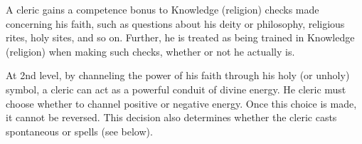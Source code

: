 \begin{comment}
\cf{Clr}{Turn or Rebuke Undead (Su)} Any cleric, regardless of alignment, has the power to affect undead creatures by channeling the power of his faith through his holy (or unholy) symbol.

Turning or rebuking undead requires a standard action and affects all undead within a large (50 foot) radius of the cleric to flee, as if panicked. Undead receive a Will save to negate the effect. The DC for this Will save is equal to 10 \add 1/2 the cleric's turning level \add the cleric's Cha. A cleric's turning level is normally equal to his class level. Intelligent undead receive a new saving throw each round to end the effect.

A cleric that turns undead causes the affected creatures to flee for 1 minute as if panicked. If the cleric's turning level is at least twice the HD of an affected undead, it is instead destroyed utterly.

A cleric that rebukes undead causes the affected creatures to cower for 1 minute. If the cleric's turning level is at least twice the HD of an affected undead, it instead falls under the control of the cleric for one day per turning level. (Since intelligent undead receive a new saving throw each round, only unintelligent undead can be consistently controlled in this fashion.)

A good cleric (or a neutral cleric who worships a good deity) can turn or destroy undead creatures. An evil cleric (or a neutral cleric who worships an evil deity) instead rebukes or commands such creatures. A neutral cleric of a neutral deity must choose whether his turning ability functions as that of a good cleric or an evil cleric. Once this choice is made, it cannot be reversed.

A cleric may attempt to turn or rebuke undead a number of times per day
equal to 3 \add his Charisma value.
\end{comment}

  A cleric gains a  competence bonus to Knowledge (religion) checks made concerning his faith, such as questions about his deity or philosophy, religious rites, holy sites, and so on. Further, he is treated as being trained in Knowledge (religion) when making such checks, whether or not he actually is.

 At 2nd level, by channeling the power of his faith through his holy (or unholy) symbol, a cleric can act as a powerful conduit of divine energy. He cleric must choose whether to channel positive or negative energy. Once this choice is made, it cannot be reversed. This decision also determines whether the cleric casts spontaneous  or  spells (see below).

